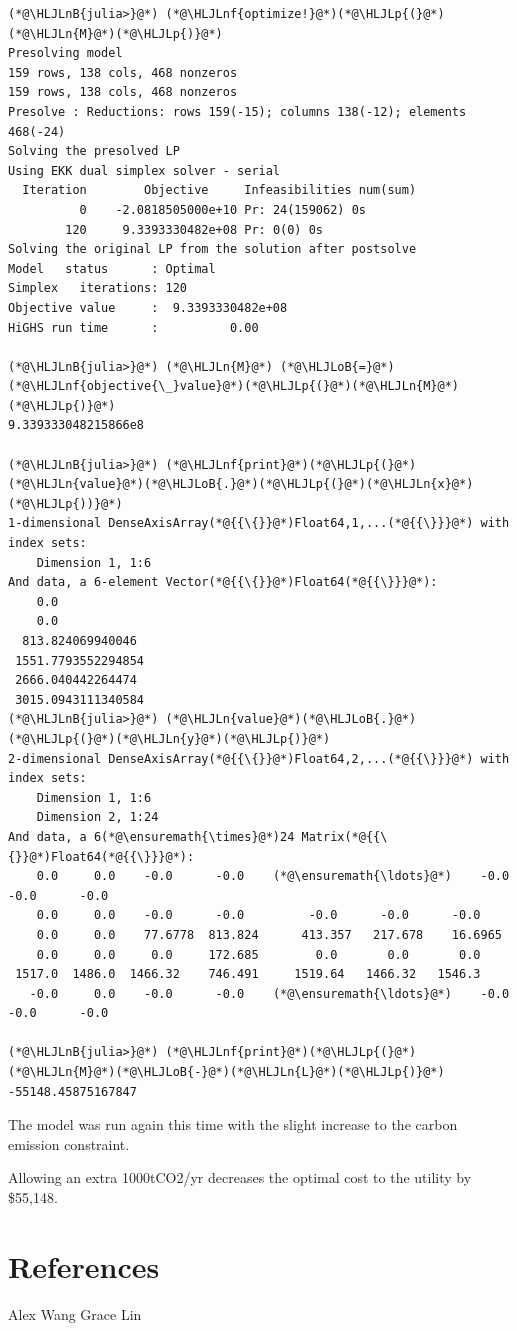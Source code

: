 \documentclass[12pt,a4paper]{article}
\newcommand{\HLJLn}[1]{#1}
\newcommand{\HLJLnf}[1]{\textcolor[RGB]{66,102,213}{#1}}
\newcommand{\HLJLnB}[1]{\textcolor[RGB]{59,151,46}{#1}}
\newcommand{\HLJLoB}[1]{\textcolor[RGB]{102,102,102}{\textbf{#1}}}
\newcommand{\HLJLp}[1]{#1}
\begin{document}
\begin{lstlisting}
(*@\HLJLnB{julia>}@*) (*@\HLJLnf{optimize!}@*)(*@\HLJLp{(}@*)(*@\HLJLn{M}@*)(*@\HLJLp{)}@*)
Presolving model
159 rows, 138 cols, 468 nonzeros
159 rows, 138 cols, 468 nonzeros
Presolve : Reductions: rows 159(-15); columns 138(-12); elements 468(-24)
Solving the presolved LP
Using EKK dual simplex solver - serial
  Iteration        Objective     Infeasibilities num(sum)
          0    -2.0818505000e+10 Pr: 24(159062) 0s
        120     9.3393330482e+08 Pr: 0(0) 0s
Solving the original LP from the solution after postsolve
Model   status      : Optimal
Simplex   iterations: 120
Objective value     :  9.3393330482e+08
HiGHS run time      :          0.00

(*@\HLJLnB{julia>}@*) (*@\HLJLn{M}@*) (*@\HLJLoB{=}@*) (*@\HLJLnf{objective{\_}value}@*)(*@\HLJLp{(}@*)(*@\HLJLn{M}@*)(*@\HLJLp{)}@*)
9.339333048215866e8

(*@\HLJLnB{julia>}@*) (*@\HLJLnf{print}@*)(*@\HLJLp{(}@*)(*@\HLJLn{value}@*)(*@\HLJLoB{.}@*)(*@\HLJLp{(}@*)(*@\HLJLn{x}@*)(*@\HLJLp{))}@*)
1-dimensional DenseAxisArray(*@{{\{}}@*)Float64,1,...(*@{{\}}}@*) with index sets:
    Dimension 1, 1:6
And data, a 6-element Vector(*@{{\{}}@*)Float64(*@{{\}}}@*):
    0.0
    0.0
  813.824069940046
 1551.7793552294854
 2666.040442264474
 3015.0943111340584
(*@\HLJLnB{julia>}@*) (*@\HLJLn{value}@*)(*@\HLJLoB{.}@*)(*@\HLJLp{(}@*)(*@\HLJLn{y}@*)(*@\HLJLp{)}@*)
2-dimensional DenseAxisArray(*@{{\{}}@*)Float64,2,...(*@{{\}}}@*) with index sets:
    Dimension 1, 1:6
    Dimension 2, 1:24
And data, a 6(*@\ensuremath{\times}@*)24 Matrix(*@{{\{}}@*)Float64(*@{{\}}}@*):
    0.0     0.0    -0.0      -0.0    (*@\ensuremath{\ldots}@*)    -0.0      -0.0      -0.0
    0.0     0.0    -0.0      -0.0         -0.0      -0.0      -0.0
    0.0     0.0    77.6778  813.824      413.357   217.678    16.6965
    0.0     0.0     0.0     172.685        0.0       0.0       0.0
 1517.0  1486.0  1466.32    746.491     1519.64   1466.32   1546.3
   -0.0     0.0    -0.0      -0.0    (*@\ensuremath{\ldots}@*)    -0.0      -0.0      -0.0

(*@\HLJLnB{julia>}@*) (*@\HLJLnf{print}@*)(*@\HLJLp{(}@*)(*@\HLJLn{M}@*)(*@\HLJLoB{-}@*)(*@\HLJLn{L}@*)(*@\HLJLp{)}@*)
-55148.45875167847
\end{lstlisting}

The model was run again this time with the slight increase to the carbon emission constraint.

Allowing an extra 1000tCO2/yr decreases the optimal cost to the utility by \$55,148. 

\section{References}
Alex Wang Grace Lin
\end{document}
